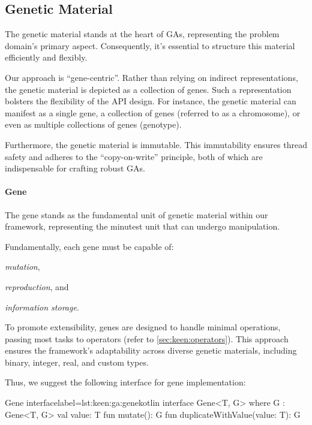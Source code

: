 \subsection{Genetic Material}
\label{sec:keen:ga:material}
  The genetic material stands at the heart of GAs, representing the problem 
  domain's primary aspect.
  Consequently, it's essential to structure this material efficiently and 
  flexibly.

  Our approach is \enquote{gene-centric}.
  Rather than relying on indirect representations, the genetic material is 
  depicted as a collection of genes.
  Such a representation bolsters the flexibility of the API design.
  For instance, the genetic material can manifest as a single gene, a 
  collection of genes (referred to as a chromosome), or even as multiple 
  collections of genes (genotype).

  Furthermore, the genetic material is immutable.
  This immutability ensures thread safety and adheres to the 
  \enquote{copy-on-write} principle, both of which are indispensable for 
  crafting robust GAs.

  \paragraph{Gene}
    The gene stands as the fundamental unit of genetic material within our 
    framework, representing the minutest unit that can undergo manipulation.

    Fundamentally, each gene must be capable of:
    \begin{enumerate*}
      \item \textit{mutation},
      \item \textit{reproduction}, and
      \item \textit{information storage}.
    \end{enumerate*}
    To promote extensibility, genes are designed to handle minimal 
    operations, passing most tasks to operators 
    (refer to \vref{sec:keen:operators}).
    This approach ensures the framework's adaptability across diverse 
    genetic materials, including binary, integer, real, and custom types.

    Thus, we suggest the following interface for gene implementation:

    \begin{code}{Gene interface}{label={lst:keen:ga:gene}}{kotlin}
      interface Gene<T, G> where G : Gene<T, G> {
          val value: T
          fun mutate(): G
          fun duplicateWithValue(value: T): G
      }
    \end{code}

